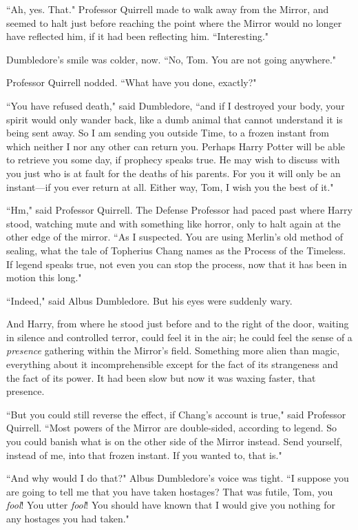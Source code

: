 ``Ah, yes. That." Professor Quirrell made to walk away from the Mirror, and seemed to halt just before reaching the point where the Mirror would no longer have reflected him, if it had been reflecting him. ``Interesting."

Dumbledore's smile was colder, now. ``No, Tom. You are not going anywhere."

Professor Quirrell nodded. ``What have you done, exactly?"

``You have refused death," said Dumbledore, ``and if I destroyed your body, your spirit would only wander back, like a dumb animal that cannot understand it is being sent away. So I am sending you outside Time, to a frozen instant from which neither I nor any other can return you. Perhaps Harry Potter will be able to retrieve you some day, if prophecy speaks true. He may wish to discuss with you just who is at fault for the deaths of his parents. For you it will only be an instant---if you ever return at all. Either way, Tom, I wish you the best of it."

``Hm," said Professor Quirrell. The Defense Professor had paced past where Harry stood, watching mute and with something like horror, only to halt again at the other edge of the mirror. ``As I suspected. You are using Merlin's old method of sealing, what the tale of Topherius Chang names as the Process of the Timeless. If legend speaks true, not even you can stop the process, now that it has been in motion this long."

``Indeed," said Albus Dumbledore. But his eyes were suddenly wary.

And Harry, from where he stood just before and to the right of the door, waiting in silence and controlled terror, could feel it in the air; he could feel the sense of a \emph{presence} gathering within the Mirror's field. Something more alien than magic, everything about it incomprehensible except for the fact of its strangeness and the fact of its power. It had been slow but now it was waxing faster, that presence.

``But you could still reverse the effect, if Chang's account is true," said Professor Quirrell. ``Most powers of the Mirror are double-sided, according to legend. So you could banish what is on the other side of the Mirror instead. Send yourself, instead of me, into that frozen instant. If you wanted to, that is."

``And why would I do that?" Albus Dumbledore's voice was tight. ``I suppose you are going to tell me that you have taken hostages? That was futile, Tom, you \emph{fool}! You utter \emph{fool}! You should have known that I would give you nothing for any hostages you had taken."

